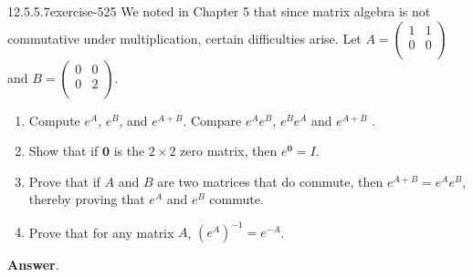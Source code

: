 \documentclass[twoside,10pt,]{book}
\numberwithin{equation}{section}
\begin{document}
\begin{divisionsolution}{12.5.5.7}{}{exercise-525}%
\hypertarget{p-4712}{}%
We noted in Chapter 5 that since matrix algebra is not commutative under multiplication, certain difficulties arise.  Let \(A=\left(
\begin{array}{cc}
1 & 1 \\
0 & 0 \\
\end{array}
\right)\) and \(B=\left(
\begin{array}{cc}
0 & 0 \\
0 & 2 \\
\end{array}
\right)\).\leavevmode%
\begin{enumerate}[label=(\alph*)]
\item\hypertarget{li-2145}{}\hypertarget{p-4713}{}%
Compute   \(e^A\), \(e^B\), and \(e^{A+B}\).   Compare \(e^A e^{B}\), \(e^B e^A\) and \(e^{A+B}\) .%
\item\hypertarget{li-2146}{}\hypertarget{p-4714}{}%
Show that if \(\pmb{0}\) is the \(2\times 2\) zero matrix, then \(e^{\pmb{0}}= I\).%
\item\hypertarget{li-2147}{}\hypertarget{p-4715}{}%
Prove that if \(A\) and \(B\) are two matrices that do commute, then  \(e^{A+B}=e^Ae^B\), thereby proving that \(e^A\) and \(e^B\) commute.%
\item\hypertarget{li-2148}{}\hypertarget{p-4716}{}%
Prove that for any matrix \(A\),  \(\left(e^A\right)^{-1}= e^{-A}\).%
\end{enumerate}
%
\par\smallskip%
\noindent\textbf{Answer}.\quad%
\hypertarget{p-4717}{}%
\leavevmode%
\end{divisionsolution}
\end{document}
